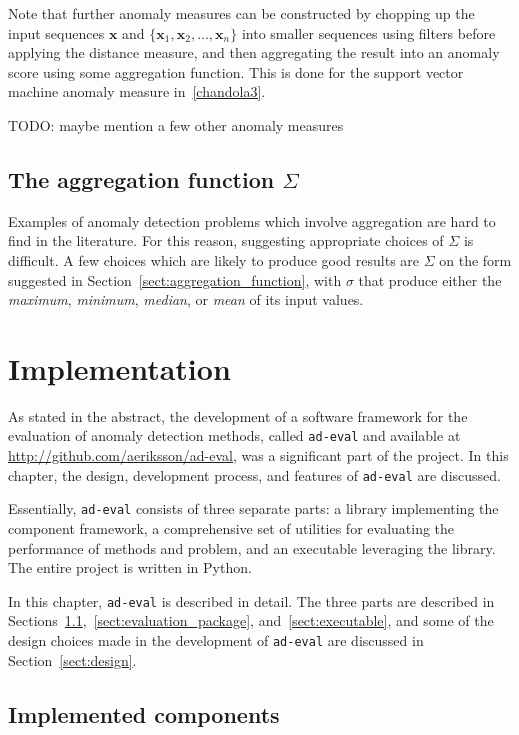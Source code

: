 Note that further anomaly measures can be constructed by chopping up the input sequences $\mathbf{x}$ and $\{\mathbf{x}_1, \mathbf{x}_2, \dots, \mathbf{x}_n\}$ into smaller sequences using filters before applying the distance measure, and then aggregating the result into an anomaly score using some aggregation function. This is done for the support vector machine anomaly measure in~\ref{chandola3}.

TODO: maybe mention a few other anomaly measures

\subsection{The aggregation function $\Sigma$}

Examples of anomaly detection problems which involve aggregation are hard to find in the literature. For this reason, suggesting appropriate choices of $\Sigma$ is difficult. A few choices which are likely to produce good results are $\Sigma$ on the form suggested in Section~\ref{sect:aggregation_function}, with $\sigma$ that produce either the \emph{maximum}, \emph{minimum}, \emph{median}, or \emph{mean} of its input values.

\section{Implementation}
\label{ch:implementation}

As stated in the abstract, the development of a software framework for the evaluation of anomaly detection methods, called \texttt{ad-eval} and available at \url{http://github.com/aeriksson/ad-eval}, was a significant part of the project. In this chapter, the design, development process, and features of \texttt{ad-eval} are discussed.

Essentially, \texttt{ad-eval} consists of three separate parts: a library implementing the component framework, a comprehensive set of utilities for evaluating the performance of methods and problem, and an executable leveraging the library. The entire project is written in Python.

In this chapter, \texttt{ad-eval} is described in detail. The three parts are described in Sections~\ref{sect:implemented_problems},~\ref{sect:evaluation_package}, and~\ref{sect:executable}, and some of the design choices made in the development of \texttt{ad-eval} are discussed in Section~\ref{sect:design}.

\subsection{Implemented components}
\label{sect:implemented_problems}


